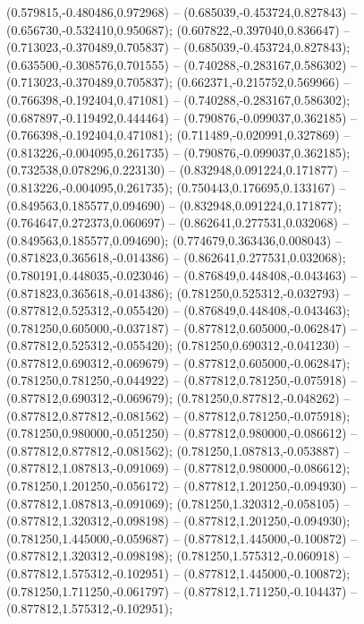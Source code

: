  (0.579815,-0.480486,0.972968) -- (0.685039,-0.453724,0.827843) -- (0.656730,-0.532410,0.950687);
 (0.607822,-0.397040,0.836647) -- (0.713023,-0.370489,0.705837) -- (0.685039,-0.453724,0.827843);
 (0.635500,-0.308576,0.701555) -- (0.740288,-0.283167,0.586302) -- (0.713023,-0.370489,0.705837);
 (0.662371,-0.215752,0.569966) -- (0.766398,-0.192404,0.471081) -- (0.740288,-0.283167,0.586302);
 (0.687897,-0.119492,0.444464) -- (0.790876,-0.099037,0.362185) -- (0.766398,-0.192404,0.471081);
 (0.711489,-0.020991,0.327869) -- (0.813226,-0.004095,0.261735) -- (0.790876,-0.099037,0.362185);
 (0.732538,0.078296,0.223130) -- (0.832948,0.091224,0.171877) -- (0.813226,-0.004095,0.261735);
 (0.750443,0.176695,0.133167) -- (0.849563,0.185577,0.094690) -- (0.832948,0.091224,0.171877);
 (0.764647,0.272373,0.060697) -- (0.862641,0.277531,0.032068) -- (0.849563,0.185577,0.094690);
 (0.774679,0.363436,0.008043) -- (0.871823,0.365618,-0.014386) -- (0.862641,0.277531,0.032068);
 (0.780191,0.448035,-0.023046) -- (0.876849,0.448408,-0.043463) -- (0.871823,0.365618,-0.014386);
 (0.781250,0.525312,-0.032793) -- (0.877812,0.525312,-0.055420) -- (0.876849,0.448408,-0.043463);
 (0.781250,0.605000,-0.037187) -- (0.877812,0.605000,-0.062847) -- (0.877812,0.525312,-0.055420);
 (0.781250,0.690312,-0.041230) -- (0.877812,0.690312,-0.069679) -- (0.877812,0.605000,-0.062847);
 (0.781250,0.781250,-0.044922) -- (0.877812,0.781250,-0.075918) -- (0.877812,0.690312,-0.069679);
 (0.781250,0.877812,-0.048262) -- (0.877812,0.877812,-0.081562) -- (0.877812,0.781250,-0.075918);
 (0.781250,0.980000,-0.051250) -- (0.877812,0.980000,-0.086612) -- (0.877812,0.877812,-0.081562);
 (0.781250,1.087813,-0.053887) -- (0.877812,1.087813,-0.091069) -- (0.877812,0.980000,-0.086612);
 (0.781250,1.201250,-0.056172) -- (0.877812,1.201250,-0.094930) -- (0.877812,1.087813,-0.091069);
 (0.781250,1.320312,-0.058105) -- (0.877812,1.320312,-0.098198) -- (0.877812,1.201250,-0.094930);
 (0.781250,1.445000,-0.059687) -- (0.877812,1.445000,-0.100872) -- (0.877812,1.320312,-0.098198);
 (0.781250,1.575312,-0.060918) -- (0.877812,1.575312,-0.102951) -- (0.877812,1.445000,-0.100872);
 (0.781250,1.711250,-0.061797) -- (0.877812,1.711250,-0.104437) -- (0.877812,1.575312,-0.102951);

